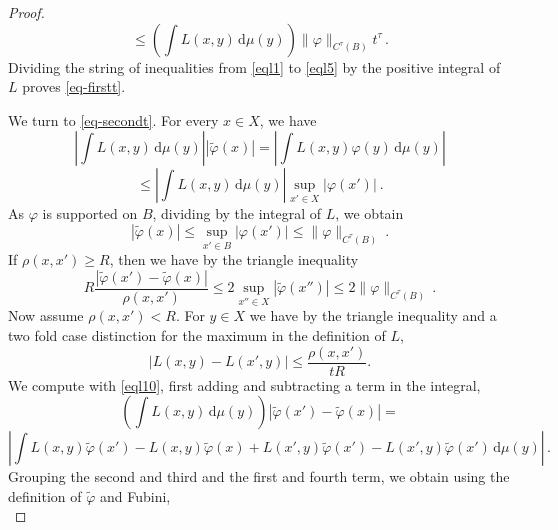 \begin{proof}
   \begin{equation}\label{eql5}
         \le \left(\int L(x,y) \, \mathrm{d}\mu(y)\right)
         \|\varphi\|_{C^\tau(B)} t^{\tau} \, .
    \end{equation}
 Dividing the string of inequalities from \eqref{eql1} to
\eqref{eql5} by the positive integral of $L$ proves \eqref{eq-firstt}.


We turn to \eqref{eq-secondt}. For every $x\in X$, we have
\begin{equation}
    \left|\int L(x,y) \, \mathrm{d}\mu(y)\right||\tilde{\varphi}(x)|
    =\left|\int L(x,y) {\varphi}(y)\, \mathrm{d}\mu(y)\right|
\end{equation}
 \begin{equation}
    \le \left|\int L(x,y) \, \mathrm{d}\mu(y)\right| \sup_{x'\in X}
    |{\varphi}(x')|\ .
\end{equation}
As $\varphi$ is supported on $B$, dividing by the integral of $L$, we obtain
\begin{equation}\label{eql42}
 |\tilde{\varphi}(x)|\le \sup_{x'\in B}
    |{\varphi}(x')|\le \|\varphi\|_{C^\tau(B)}\ .
\end{equation}
If $\rho(x,x')\ge R$, then we have by the triangle inequality
  \begin{equation}\label{eql52}
 R\frac{|\tilde{\varphi}(x') - \tilde \varphi(x)|}{\rho(x,x')} \le
 2\sup_{x''\in X} |\tilde{\varphi}(x'')|\le 2\|\varphi\|_{C^\tau(B)}\, .
\end{equation}
Now assume $\rho(x,x')< R$. For $y\in X$ we have by the triangle inequality and a two fold case distinction
for the maximum in the definition of $L$,
\begin{equation}\label{eql10}
   |L(x,y) - L(x',y)| \le \frac{\rho(x,x')}{tR}.
\end{equation}
We compute with \eqref{eql10}, first adding and subtracting a term in the integral,
\begin{equation}
    \left(\int L(x,y) \, \mathrm{d}\mu(y)\right)
    |\tilde{\varphi}(x') - \tilde \varphi(x)|=
\end{equation}
\begin{equation}
    \left|\int L(x,y) \tilde{\varphi}(x')
    -L(x,y) \tilde{\varphi}(x)
    +L(x',y) \tilde{\varphi}(x')-
     L(x',y) \tilde{\varphi}(x')
    \, \mathrm{d}\mu(y)\right|\,.
\end{equation}
Grouping the second and third and the first and fourth term, we obtain using the definition of $\tilde \varphi$ and Fubini,
\begin{equation}\label{eql21}

\end{equation}
\end{proof}
